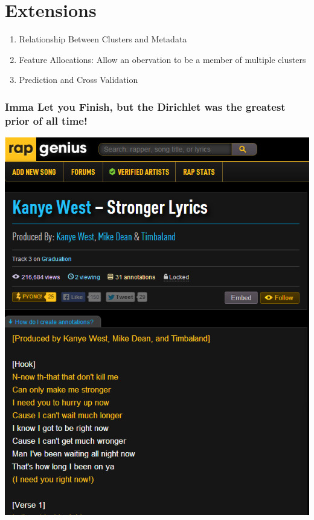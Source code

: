 \documentclass[handout]{beamer}
\begin{document}
\section{Extensions}
\begin{frame}
\begin{enumerate}
\item<+-> Relationship Between Clusters and Metadata
\item<+-> Feature Allocations: Allow an obervation to be a member of multiple clusters
\item<+-> Prediction and Cross Validation
\end{enumerate}
\end{frame}

\begin{frame}
\frametitle{Imma Let you Finish, but the Dirichlet was the greatest prior of all time!}
\pause
\begin{center}
\includegraphics[height=1.0\textheight]{Images/lyrics_sample.png}
\end{center}
\end{frame}
\end{document}
